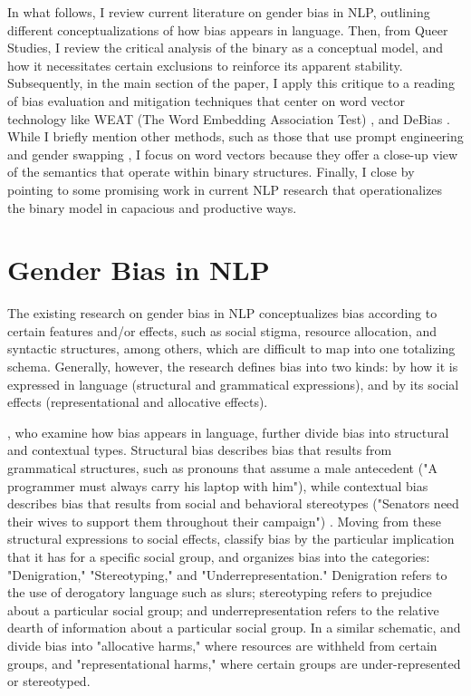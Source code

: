 \documentclass[11pt]{article}
\begin{document}
In what follows, I review current literature on gender bias in NLP,
outlining different conceptualizations of how bias appears in
language. Then, from Queer Studies, I review the critical analysis of
the binary as a conceptual model, and how it necessitates certain
exclusions to reinforce its apparent stability. Subsequently, in the main section of the paper, I apply
this critique to a reading of bias evaluation and mitigation
techniques that center on word vector technology like WEAT (The Word
Embedding Association Test) \citep{caliskan:2017}, and DeBias
\citep{bolukbasi:2016}. While I briefly mention other methods, such as those that use prompt engineering and gender swapping \citep{zhao:2018,meade:2022,nemani:2023}, I focus on word vectors because they offer
a close-up view of the semantics that operate within binary structures.
Finally, I close by
pointing to some promising work in current NLP research that operationalizes the binary model in
capacious and productive ways.

\section{Gender Bias in NLP} \label{gbnlp}

The existing research on gender bias in NLP conceptualizes bias according to certain features and/or effects, such as social stigma, resource allocation, and syntactic structures, among others, which are difficult to map into one totalizing schema. Generally, however, the research defines bias into two kinds: by how it is expressed in language (structural and grammatical expressions), and
by its social effects (representational and allocative effects). 

\citet{hitti:2019}, who examine how bias
appears in language, further divide bias into structural and contextual
types. Structural bias describes bias that results from grammatical
structures, such as pronouns that assume a male antecedent ("A
programmer must always carry his laptop with him"), while contextual
bias describes bias that results from social and behavioral stereotypes
("Senators need their wives to support them throughout their
campaign") \citep{hitti:2019}. Moving from these structural expressions to
social effects, \citet{nemani:2023} classify bias by the particular
implication that it has for a specific social group, and
organizes bias into the categories: "Denigration," "Stereotyping,"
and "Underrepresentation." Denigration refers to the use of
derogatory language such as slurs; stereotyping refers to prejudice
about a particular social group; and underrepresentation refers to
the relative dearth of information about a particular social group.
In a similar schematic, \citet{blodgett:2020} and \citet{barocas:2017} divide bias
into "allocative harms," where resources are withheld from certain
groups, and "representational harms," where certain groups are
under-represented or stereotyped.
\end{document}
